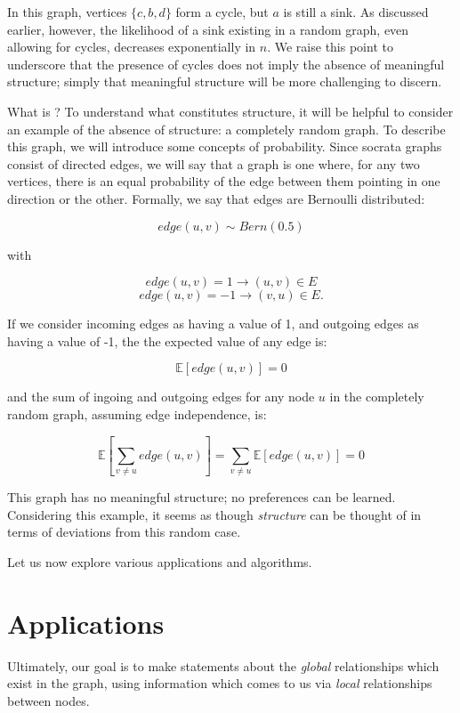 \documentclass[12pt]{book}
\begin{document}
In this graph, vertices $\{c, b, d\}$ form a cycle, but $a$ is still a sink.
As discussed earlier, however, the likelihood of a sink existing in a random graph, even allowing for cycles, decreases exponentially in $n$.
We raise this point to underscore that the presence of cycles does not imply the absence of meaningful structure; simply that meaningful structure will be more challenging to discern.

\bigskip

What is ?
To understand what constitutes structure, it will be helpful to consider an example of the absence of structure: a completely random graph.
To describe this graph, we will introduce some concepts of probability.
Since socrata graphs consist of directed edges, we will say that a  graph is one where, for any two vertices, there is an equal probability of the edge between them pointing in one direction or the other.
Formally, we say that edges are Bernoulli distributed:

\[
edge(u,v) \sim Bern(0.5)
\]

with 

\[
edge(u,v) = 1 \rightarrow (u,v) \in E
\]
\[
edge(u,v) = -1 \rightarrow (v,u) \in E.
\]

If we consider incoming edges as having a value of 1, and outgoing edges as having a value of -1, the the expected value of any edge is:

\[
\mathbb{E}[edge(u,v)] = 0
\]

and the sum of ingoing and outgoing edges for any node $u$ in the completely random graph, assuming edge independence, is:

\[
\mathbb{E}\left[\sum_{v \neq u} edge(u,v)\right] = \sum_{v \neq u}\mathbb{E}[edge(u,v)] = 0
\]

This graph has no meaningful structure; no preferences can be learned.
Considering this example, it seems as though \textit{structure} can be thought of in terms of deviations from this random case.

Let us now explore various applications and algorithms.

\section{Applications}

Ultimately, our goal is to make statements about the \textit{global} relationships which exist in the graph, using information which comes to us via \textit{local} relationships between nodes.
\end{document}
